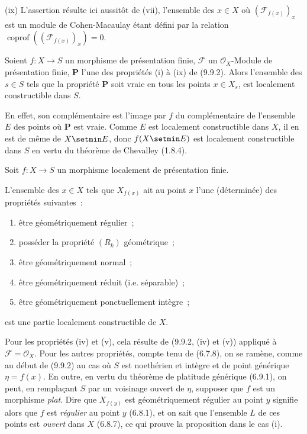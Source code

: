 (ix) L'assertion résulte ici aussitôt de (vii), l'ensemble des $x\in X$ où
$(\mathcal F_{f(x)})_x$ est un module de Cohen-Macaulay étant défini par la
relation $\operatorname{coprof}((\mathcal F_{f(x)})_x)=0$.

\begin{corollary}[9.9.3]
\label{IV.9.9.3-fr}
Soient $f:X\to S$ un morphisme de présentation finie, $\mathcal F$ un
$\mathcal O_X$-Module de présentation finie, $\boldsymbol{P}$ l'une des propriétés
\textup{(i)} à \textup{(ix)} de \textup{(9.9.2)}. Alors l'ensemble des $s\in S$ tels que la propriété
$\boldsymbol{P}$ soit vraie en tous les points $x\in X_s$, est localement
constructible dans $S$.
\end{corollary}

En effet, son complémentaire est l'image par $f$ du complémentaire de
l'ensemble $E$ des points où $\boldsymbol{P}$ est vraie. Comme $E$ est localement
constructible dans $X$, il en est de même de $X\setmin E$, donc $f(X\setmin E)$ est
localement constructible dans $S$ en vertu du théorème de Chevalley (1.8.4).

\begin{proposition}[9.9.4]
\label{IV.9.9.4-fr}
Soit $f:X\to S$ un morphisme localement de présentation finie.

L'ensemble des
$x\in X$ tels que $X_{f(x)}$ ait au point $x$ l'une (déterminée) des propriétés
suivantes~:
\begin{enumerate}
\item[\textup{(i)}] être géométriquement régulier~;
\item[\textup{(ii)}] posséder la propriété $(R_k)$ géométrique~;
\item[\textup{(iii)}] être géométriquement normal~;
\item[\textup{(iv)}] être géométriquement réduit \textup{(i.e.} séparable\textup{)}~;
\item[\textup{(v)}] être géométriquement ponctuellement intègre~;
\end{enumerate}
est une partie localement constructible de $X$.
\end{proposition}

Pour les propriétés (iv) et (v), cela résulte de (9.9.2, (iv) et (v)) appliqué à
$\mathcal F=\mathcal O_X$. Pour les autres propriétés, compte tenu de (6.7.8),
on se ramène, comme au début de (9.9.2) au cas où $S$ est noethérien et intègre
et de point générique $\eta=f(x)$. En outre, en vertu du théorème de platitude
générique (6.9.1), on peut, en remplaçant $S$ par un voisinage ouvert de
$\eta$, supposer que $f$ est un morphisme \emph{plat}. Dire que $X_{f(y)}$ est
géométriquement régulier au point $y$ signifie alors que $f$ est
\emph{régulier} au point $y$ (6.8.1), et on sait que l'ensemble $L$ de ces
points est \emph{ouvert} dans $X$ (6.8.7), ce qui prouve la proposition dans le
cas (i).

